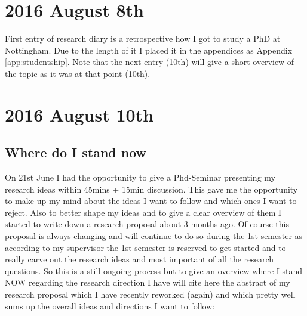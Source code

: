 \section*{2016 August 8th}
First entry of research diary is a retrospective how I got to study a PhD at Nottingham. Due to the length of it I placed it in the appendices as Appendix \ref{app:studentship}. Note that the next entry (10th) will give a short overview of the topic as it was at that point (10th).

\section*{2016 August 10th}
\subsection*{Where do I stand now}
On 21st June I had the opportunity to give a Phd-Seminar presenting my research ideas within 45mins + 15min discussion. This gave me the opportunity to make up my mind about the ideas I want to follow and which ones I want to reject. Also to better shape my ideas and to give a clear overview of them I started to write down a research proposal about 3 months ago. Of course this proposal is always changing and will continue to do so during the 1st semester as according to my supervisor the 1st semester is reserved to get started and to really carve out the research ideas and most important of all the research questions. So this is a still ongoing process but to give an overview where I stand NOW regarding the research direction I have will cite here the abstract of my research proposal which I have recently reworked (again) and which pretty well sums up the overall ideas and directions I want to follow:

